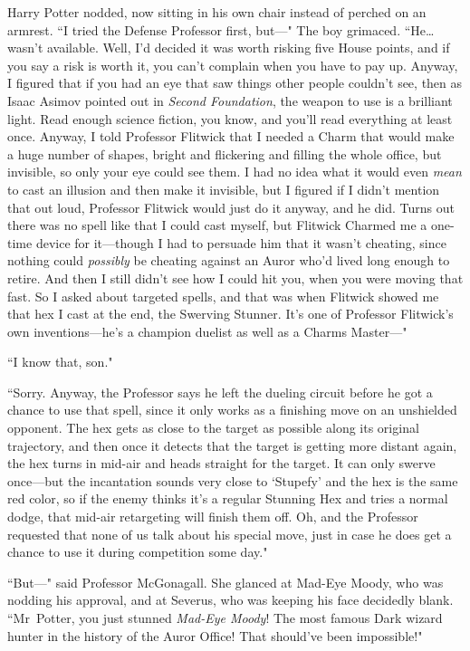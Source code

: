 Harry Potter nodded, now sitting in his own chair instead of perched on an armrest. ``I tried the Defense Professor first, but—" The boy grimaced. ``He{\ldots} wasn't available. Well, I'd decided it was worth risking five House points, and if you say a risk is worth it, you can't complain when you have to pay up. Anyway, I figured that if you had an eye that saw things other people couldn't see, then as Isaac Asimov pointed out in \emph{Second Foundation}, the weapon to use is a brilliant light. Read enough science fiction, you know, and you'll read everything at least once. Anyway, I told Professor Flitwick that I needed a Charm that would make a huge number of shapes, bright and flickering and filling the whole office, but invisible, so only your eye could see them. I had no idea what it would even \emph{mean} to cast an illusion and then make it invisible, but I figured if I didn't mention that out loud, Professor Flitwick would just do it anyway, and he did. Turns out there was no spell like that I could cast myself, but Flitwick Charmed me a one-time device for it—though I had to persuade him that it wasn't cheating, since nothing could \emph{possibly} be cheating against an Auror who'd lived long enough to retire. And then I still didn't see how I could hit you, when you were moving that fast. So I asked about targeted spells, and that was when Flitwick showed me that hex I cast at the end, the Swerving Stunner. It's one of Professor Flitwick's own inventions—he's a champion duelist as well as a Charms Master—"

``I know that, son."

``Sorry. Anyway, the Professor says he left the dueling circuit before he got a chance to use that spell, since it only works as a finishing move on an unshielded opponent. The hex gets as close to the target as possible along its original trajectory, and then once it detects that the target is getting more distant again, the hex turns in mid-air and heads straight for the target. It can only swerve once—but the incantation sounds very close to `Stupefy' and the hex is the same red color, so if the enemy thinks it's a regular Stunning Hex and tries a normal dodge, that mid-air retargeting will finish them off. Oh, and the Professor requested that none of us talk about his special move, just in case he does get a chance to use it during competition some day."

``But—" said Professor McGonagall. She glanced at Mad-Eye Moody, who was nodding his approval, and at Severus, who was keeping his face decidedly blank. ``Mr~Potter, you just stunned \emph{Mad-Eye Moody}! The most famous Dark wizard hunter in the history of the Auror Office! That should've been impossible!"

